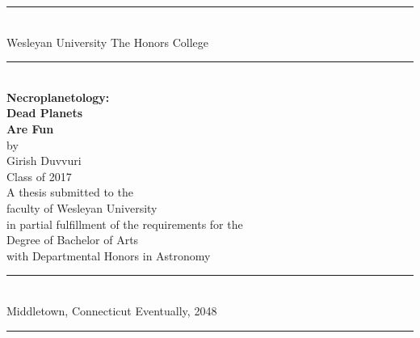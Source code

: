 \documentclass[12pt,oneside]{book}
\begin{document}
\frontmatter

\pagestyle{empty}
\begin{titlepage}
\begin{center}
\rule{5.75in}{1pt} \\
\vspace*{-0.125in}
{\large \doublespacing Wesleyan University} \hfill {\large \doublespacing The Honors College}
\rule[0.2in]{5.75in}{1pt} \\
\vspace*{0.8in}
{\LARGE \singlespacing \bf Necroplanetology: \\ Dead Planets \\Are Fun} \\
\vspace*{0.05in}
\vspace*{0.10in}
{\large \vspace*{0.20in}  \singlespacing by \vspace*{.2in}
\\Girish Duvvuri \\ Class of 2017\\}
\vspace*{0.25in}
\vspace*{0.8in}
{\large \singlespacing A thesis submitted to the\\ faculty of Wesleyan University\\ in partial fulfillment of the requirements for the \\ Degree of Bachelor of Arts\\ with Departmental Honors in Astronomy\\ \vspace*{-0.15in} }
\vspace*{.25in}
\rule{5.75in}{1pt} \\
\vspace*{-0.125in}
{\large \doublespacing Middletown, Connecticut \hfill Eventually, 2048}
\rule[0.2in]{5.75in}{1pt} \\
\end{center}
\end{titlepage}


\end{document}
